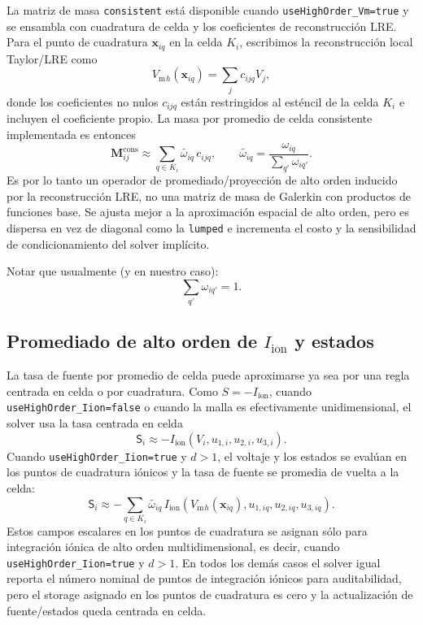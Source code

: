 \documentclass[11pt,a4paper]{article}
\newcommand{\code}[1]{\texttt{\small #1}}
\newcommand{\Vm}{V_{\text{m}}}
\newcommand{\Iion}{I_{\mathrm{ion}}}
\newcommand{\Mmass}{\mathbf{M}}
\begin{document}
La matriz de masa \code{consistent} está disponible cuando \code{useHighOrder\_Vm=true} y se
ensambla con cuadratura de celda y los coeficientes de reconstrucción LRE. Para el punto de
cuadratura $\mathbf{x}_{iq}$ en la celda $K_i$, escribimos la reconstrucción local
Taylor/LRE como
\begin{equation}
  \Vm{}_{h}(\mathbf{x}_{iq})
  =
  \sum_j c_{ijq} V_j ,
\end{equation}
donde los coeficientes no nulos $c_{ijq}$ están restringidos al esténcil de la celda $K_i$ e
incluyen el coeficiente propio. La masa por promedio de celda consistente implementada es
entonces
\begin{equation}
  \Mmass^{\mathrm{cons}}_{ij}
  \approx
  \sum_{q\in K_i}
  \bar{\omega}_{iq}\,c_{ijq},
  \qquad
  \bar{\omega}_{iq}
  =
  \frac{\omega_{iq}}{\sum_{q'}\omega_{iq'}}.
  \label{eq:consistent}
\end{equation}
Es por lo tanto un operador de promediado/proyección de alto orden inducido por la
reconstrucción LRE, no una matriz de masa de Galerkin con productos de funciones base. Se
ajusta mejor a la aproximación espacial de alto orden, pero es dispersa en vez de diagonal como la \code{lumped} e
incrementa el costo y la sensibilidad de condicionamiento del solver implícito.

Notar que usualmente (y en nuestro caso):
%
\begin{equation}
\sum_{q'}\omega_{iq'}=1.
\end{equation}

\subsection{Promediado de alto orden de \texorpdfstring{$\Iion$}{Iion} y estados}
\label{sec:iion-quad}

La tasa de fuente por promedio de celda puede aproximarse ya sea por una regla centrada en
celda o por cuadratura. Como $S=-\Iion$, cuando \code{useHighOrder\_Iion=false} o cuando la
malla es efectivamente unidimensional, el solver usa la tasa centrada en celda
\begin{equation}
  \mathsf{S}_i
  \approx
  -\Iion(V_i,u_{1,i},u_{2,i},u_{3,i}).
\end{equation}
Cuando \code{useHighOrder\_Iion=true} y $d>1$, el voltaje y los estados se evalúan en los
puntos de cuadratura iónicos y la tasa de fuente se promedia de vuelta a la celda:
\begin{equation}
  \mathsf{S}_i
  \approx
  -\sum_{q\in K_i}\bar{\omega}_{iq}\,
  \Iion
  \left(
    \Vm{}_{h}(\mathbf{x}_{iq}),
    u_{1,iq},
    u_{2,iq},
    u_{3,iq}
  \right).
  \label{eq:iion-quadrature}
\end{equation}
Estos campos escalares en los puntos de cuadratura se asignan sólo para integración iónica
de alto orden multidimensional, es decir, cuando \code{useHighOrder\_Iion=true} y $d>1$. En
todos los demás casos el solver igual reporta el número nominal de puntos de integración
iónicos para auditabilidad, pero el storage asignado en los puntos de cuadratura es cero y
la actualización de fuente/estados queda centrada en celda.
\end{document}
